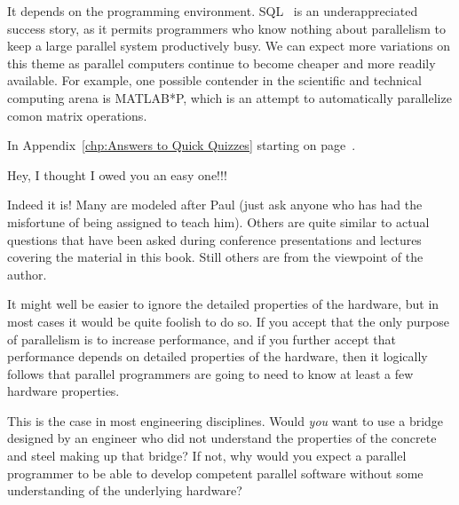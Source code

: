 
	   It depends on the programming environment.
	   SQL~\cite{DIS9075SQL92} is an underappreciated success
	   story, as it permits programmers who know nothing about parallelism
	   to keep a large parallel system productively busy.
	   We can expect more variations on this theme as parallel
	   computers continue to become cheaper and more readily available.
	   For example, one possible contender in the scientific and
	   technical computing arena is MATLAB*P,
	   which is an attempt to automatically parallelize comon
	   matrix operations.


	In Appendix~\ref{chp:Answers to Quick Quizzes} starting on
	page~\pageref{chp:Answers to Quick Quizzes}.

	Hey, I thought I owed you an easy one!!!


	Indeed it is!
 	Many are modeled after Paul (just ask anyone who has had the
	misfortune of being assigned to teach him).
	Others are quite similar to actual questions that have been asked
	during conference presentations and lectures covering the
	material in this book.
	Still others are from the viewpoint of the author.


	It might well be easier to ignore the detailed properties of
	the hardware, but in most cases it would be quite foolish
	to do so.
	If you accept that the only purpose of parallelism is to
	increase performance, and if you further accept that
	performance depends on detailed properties of the hardware,
	then it logically follows that parallel programmers are going
	to need to know at least a few hardware properties.

	This is the case in most engineering disciplines.
	Would \emph{you} want to use a bridge designed by an
	engineer who did not understand the properties of
	the concrete and steel making up that bridge?
	If not, why would you expect a parallel programmer to be
	able to develop competent parallel software without some
	understanding of the underlying hardware?

